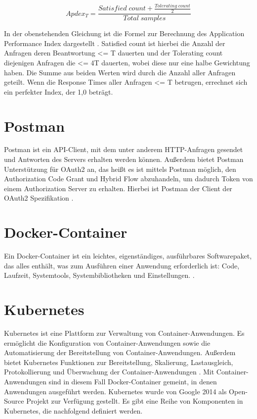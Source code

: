 \begin{equation}
  Apdex_T = \frac{Satisfied\;count + \frac{Tolerating\;count}{2}}{Total\;samples}
\end{equation}

In der obenstehenden Gleichung ist die Formel zur Berechnung des Application Performance Index dargestellt \citep{apdex:2007}. Satisfied count ist hierbei die Anzahl der Anfragen deren Beantwortung <= T dauerten und der Tolerating 
count diejenigen Anfragen die <= 4T dauerten, wobei diese nur eine halbe Gewichtung 
haben. Die Summe aus beiden Werten wird durch die Anzahl aller Anfragen geteilt. Wenn die Response Times aller Anfragen <= T betrugen, errechnet sich ein perfekter Index, 
der 1,0 beträgt.

\section{Postman}
Postman ist ein API-Client, mit dem unter anderem HTTP-Anfragen gesendet und Antworten 
des Servers erhalten werden können. Außerdem bietet Postman Unterstützung für 
OAuth2 an, das heißt es ist mittels Postman möglich, den Authorization Code Grant und
Hybrid Flow abzuhandeln, um dadurch Token von einem Authorization Server zu erhalten. Hierbei ist Postman der Client der OAuth2 Spezifikation \citep{postman:2021}.

\section{Docker-Container}
Ein Docker-Container ist ein leichtes, eigenständiges, ausführbares Softwarepaket, das alles enthält, was zum Ausführen einer Anwendung erforderlich ist: Code, Laufzeit, Systemtools, Systembibliotheken und Einstellungen. \citep{docker:2021}. 

\section{Kubernetes}
Kubernetes ist eine Plattform zur Verwaltung von Container-Anwendungen. Es ermöglicht die Konfiguration von Container-Anwendungen sowie die Automatisierung der Bereitstellung von Container-Anwendungen. Außerdem bietet Kubernetes Funktionen zur Bereitstellung, Skalierung, Lastausgleich, Protokollierung und Überwachung der Container-Anwendungen \citep{kubernetes:2020}. Mit Container-Anwendungen sind in diesem Fall Docker-Container gemeint, in denen Anwendungen ausgeführt werden. Kubernetes wurde von Google 2014 als Open-Source Projekt zur Verfügung gestellt. Es gibt eine Reihe von Komponenten in Kubernetes, die nachfolgend definiert werden.  

